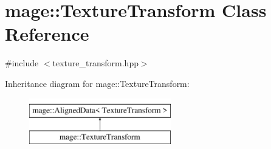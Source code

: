 \hypertarget{classmage_1_1_texture_transform}{}\section{mage\+:\+:Texture\+Transform Class Reference}
\label{classmage_1_1_texture_transform}


{\ttfamily \#include $<$texture\+\_\+transform.\+hpp$>$}

Inheritance diagram for mage\+:\+:Texture\+Transform\+:\begin{figure}[H]
\begin{center}
\leavevmode
\includegraphics[height=2.000000cm]{classmage_1_1_texture_transform}
\end{center}
\end{figure}
